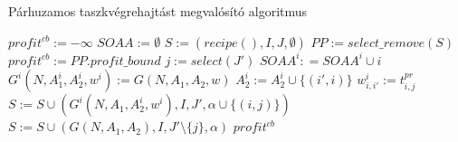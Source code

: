 \begin{algorithm}[H]
\caption{Párhuzamos taszkvégrehajtást megvalósító algoritmus}
\label{parhuzamos}
\begin{algorithmic}[1]
	\State $profit^{cb}:= -\infty$
	\State $SOAA:= \emptyset$
	\State $S:= {(recipe(),I,J,\emptyset)}$
		\State $PP:= select\_remove(S)$
					\State $profit^{cb}:=PP.profit\_bound$
				\Else
					\State $j:=select(J')$
						\State $SOAA^i: = SOAA^i\cup i$
						\State $G^i(N,A_1^i,A_2^i,w^i):= G(N,A_1,A_2,w)$
							\State $A_2^i:= A_2^i \cup \{(i',i)\}$				
						\EndFor
							\State $w_{i,i'}^i:= t_{i,j}^{pr}$
						\EndFor
						\State $S:= S \cup (G^i(N,A_1,A_2^i,w^i),I,J',\alpha \cup \{(i,j)\})$
					\EndFor
						\State $S:= S \cup (G(N,A_1,A_2),I,J'\setminus\{j\},\alpha)$
					\EndIf
				\EndIf
			\EndIf
		\EndIf
	\EndWhile
	\State \Return $profit^{cb}$
\EndProcedure
\end{algorithmic}
\end{algorithm}